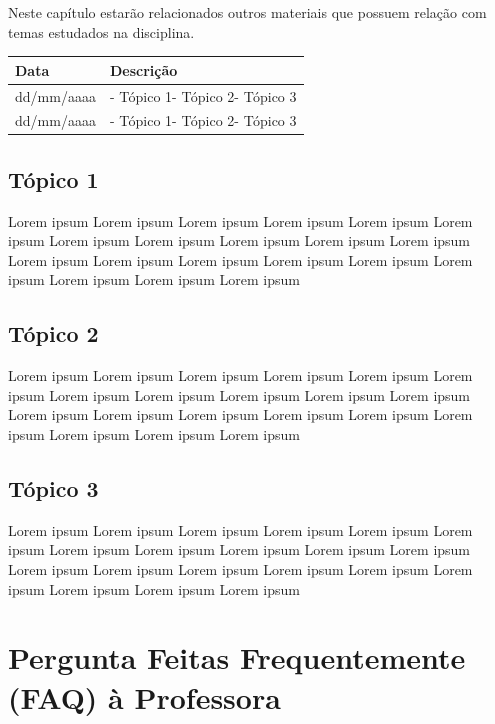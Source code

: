 \documentclass[
]{book}
\begin{document}
Neste capítulo estarão relacionados outros materiais que possuem relação com temas estudados na disciplina.

\begin{longtable}[]{@{}ll@{}}
\toprule()
Data & Descrição \\
\midrule()
\endhead
dd/mm/aaaa & - Tópico 1- Tópico 2- Tópico 3 \\
dd/mm/aaaa & - Tópico 1- Tópico 2- Tópico 3 \\
\bottomrule()
\end{longtable}

\hypertarget{tuxf3pico-1}{%
\section{Tópico 1}\label{tuxf3pico-1}}

Lorem ipsum Lorem ipsum Lorem ipsum Lorem ipsum Lorem ipsum Lorem ipsum Lorem ipsum Lorem ipsum Lorem ipsum Lorem ipsum Lorem ipsum Lorem ipsum Lorem ipsum Lorem ipsum Lorem ipsum Lorem ipsum Lorem ipsum Lorem ipsum Lorem ipsum Lorem ipsum

\hypertarget{tuxf3pico-2}{%
\section{Tópico 2}\label{tuxf3pico-2}}

Lorem ipsum Lorem ipsum Lorem ipsum Lorem ipsum Lorem ipsum Lorem ipsum Lorem ipsum Lorem ipsum Lorem ipsum Lorem ipsum Lorem ipsum Lorem ipsum Lorem ipsum Lorem ipsum Lorem ipsum Lorem ipsum Lorem ipsum Lorem ipsum Lorem ipsum Lorem ipsum

\hypertarget{tuxf3pico-3}{%
\section{Tópico 3}\label{tuxf3pico-3}}

Lorem ipsum Lorem ipsum Lorem ipsum Lorem ipsum Lorem ipsum Lorem ipsum Lorem ipsum Lorem ipsum Lorem ipsum Lorem ipsum Lorem ipsum Lorem ipsum Lorem ipsum Lorem ipsum Lorem ipsum Lorem ipsum Lorem ipsum Lorem ipsum Lorem ipsum Lorem ipsum

\hypertarget{pergunta-feitas-frequentemente-faq-uxe0-professora}{%
\chapter{Pergunta Feitas Frequentemente (FAQ) à Professora}\label{pergunta-feitas-frequentemente-faq-uxe0-professora}}
\end{document}
